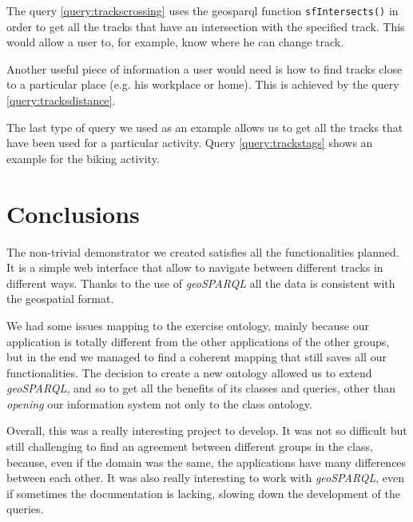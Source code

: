 \documentclass[11pt,a4paper]{scrreprt}
\begin{document}
The query \ref{query:trackscrossing} uses the geosparql function \texttt{sfIntersects()} in order to get all the tracks that have an intersection with the specified track. This would allow a user to, for example, know where he can change track.

Another useful piece of information a user would need is how to find tracks close to a particular place (e.g. his workplace or home). This is achieved by the query \ref{query:tracksdistance}.

The last type of query we used as an example allows us to get all the tracks that have been used for a particular activity. Query \ref{query:trackstags} shows an example for the biking activity.





\chapter{Conclusions}
The non-trivial demonstrator we created satisfies all the functionalities planned. 
It is a simple web interface that allow to navigate between different tracks in different ways. Thanks to the use of \textit{geoSPARQL} all the data is consistent with the geospatial format.

We had some issues mapping to the exercise ontology, mainly because our application is totally different from the other applications of the other groups, but in the end we managed to find a coherent mapping that still saves all our functionalities.
The decision to create a new ontology allowed us to extend \textit{geoSPARQL}, and so to get all the benefits of its classes and queries, other than \textit{opening} our information system not only to the class ontology.

Overall, this was a really interesting project to develop. 
It was not so difficult but still challenging to find an agreement between different groups in the class, because, even if the domain was the same, the applications have many differences between each other.
It was also really interesting to work with \textit{geoSPARQL}, even if sometimes the documentation is lacking, slowing down the development of the queries.
\end{document}
